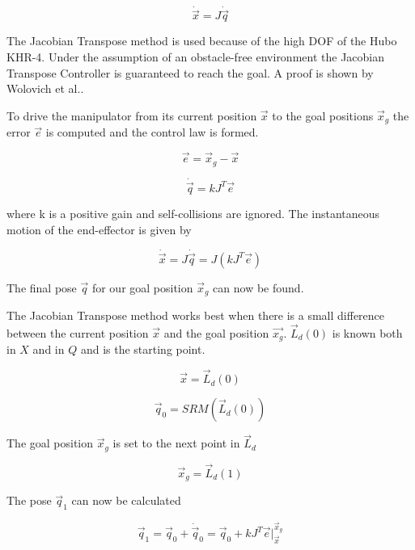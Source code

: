 \begin{equation}
\dot{\vec{x}} = J\dot{\vec{q}}
\end{equation}

  The Jacobian Transpose method is used because of the high DOF of the Hubo KHR-4.  Under the assumption of an obstacle-free environment the Jacobian Transpose Controller is guaranteed to reach the goal.  A proof is shown by Wolovich et al.\cite{4048118}.

To drive the manipulator from its current position $\vec{x}$ to the goal positions $\vec{x}_g$ the error $\vec{e}$ is computed and the control law is formed.

\begin{equation}
\vec{e} = \vec{x}_g - \vec{x}
\end{equation}

\begin{equation}
\dot{\vec{q}} = kJ^T\vec{e}
\end{equation}

where k is a positive gain and self-collisions are ignored.  The instantaneous motion of the end-effector is given by

\begin{equation}
\dot{\vec{x}} = J\dot{\vec{q}} = J(kJ^T\vec{e})
\end{equation}

The final pose $\vec{q}$ for our goal position $\vec{x}_g$ can now be found.

The Jacobian Transpose method works best when there is a small difference between the current position $\vec{x}$ and the goal position $\vec{x_g}$.  $\vec{L}_d(0)$ is known both in $X$ and in $Q$ and is the starting point.

\begin{equation}
\vec{x} = \vec{L}_d(0)
\end{equation}

\begin{equation}
\vec{q}_0 = SRM  \left( \vec{L}_d(0) \right)
\end{equation}

The goal position $\vec{x}_g$ is set to the next point in $\vec{L}_d$

\begin{equation}
\vec{x}_g = \vec{L}_d(1)
\end{equation}

The pose $\vec{q}_1$ can now be calculated

\begin{equation}
\vec{q}_1 = \vec{q}_0 + \dot{\vec{q}}_0 = \vec{q}_0 + kJ^T\vec{e}|_{\vec{x}}^{\vec{x}_g}
\end{equation}

